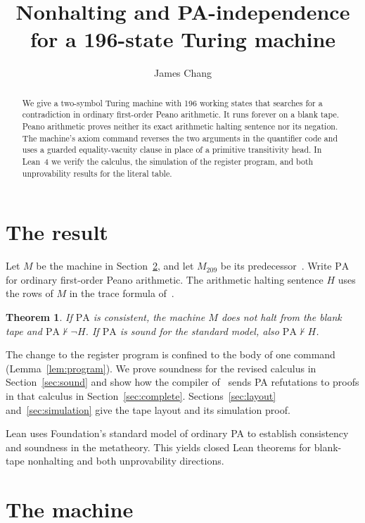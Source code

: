 \documentclass[11pt,letterpaper]{article}
\title{Nonhalting and PA-independence\\for a 196-state Turing machine}
\author{James Chang}
\date{}
\newtheorem{theorem}{Theorem}[section]
\newcommand{\PA}{\mathrm{PA}}
\begin{document}
\maketitle

\begin{abstract}
We give a two-symbol Turing machine with 196 working states that
searches for a contradiction in ordinary first-order Peano arithmetic.
It runs forever on a blank tape. Peano arithmetic proves neither its
exact arithmetic halting sentence nor its negation. The machine's
axiom command reverses the two arguments in the quantifier code and
uses a guarded equality-vacuity clause in place of a primitive
transitivity head. In Lean~4 we verify the calculus, the simulation
of the register program, and both unprovability results for the
literal table.
\end{abstract}

\section{The result}\label{sec:result}

Let $M$ be the machine in Section~\ref{sec:machine}, and let $M_{209}$
be its predecessor~\cite{pa209}. Write $\PA$ for ordinary first-order
Peano arithmetic. The arithmetic halting sentence $H$ uses the rows
of $M$ in the trace formula of~\cite[\S5]{pa209}.

\begin{theorem}\label{thm:main}
If $\PA$ is consistent, the machine $M$ does not halt from the blank
tape and $\PA\nvdash\neg H$. If $\PA$ is sound for the standard model,
also $\PA\nvdash H$.
\end{theorem}

The change to the register program is confined to the body of one
command (Lemma~\ref{lem:program}). We prove soundness for the revised
calculus in Section~\ref{sec:sound} and show how the compiler
of~\cite{pa209} sends PA refutations to proofs in that calculus in
Section~\ref{sec:complete}. Sections~\ref{sec:layout}
and~\ref{sec:simulation} give the tape layout and its simulation proof.

Lean uses Foundation's standard model of ordinary PA to establish
consistency and soundness in the metatheory. This yields closed Lean
theorems for blank-tape nonhalting and both unprovability directions.

\section{The machine}\label{sec:machine}
\end{document}

